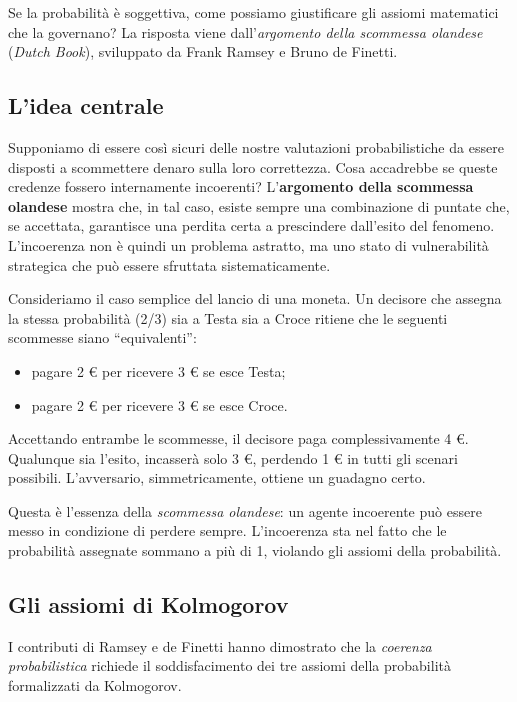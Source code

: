 \documentclass[
  letterpaper,
  DIV=11,
  numbers=noendperiod,
  oneside]{scrreprt}
\providecommand{\tightlist}{%
  \setlength{\itemsep}{0pt}\setlength{\parskip}{0pt}}
\theoremstyle{definition}
\theoremstyle{plain}
\theoremstyle{definition}
\theoremstyle{remark}
\begin{document}
Se la probabilità è soggettiva, come possiamo giustificare gli assiomi
matematici che la governano? La risposta viene dall'\emph{argomento
della scommessa olandese} (\emph{Dutch Book}), sviluppato da Frank
Ramsey e Bruno de Finetti.

\subsection{L'idea centrale}\label{lidea-centrale}

Supponiamo di essere così sicuri delle nostre valutazioni
probabilistiche da essere disposti a scommettere denaro sulla loro
correttezza. Cosa accadrebbe se queste credenze fossero internamente
incoerenti? L'\textbf{argomento della scommessa olandese} mostra che, in
tal caso, esiste sempre una combinazione di puntate che, se accettata,
garantisce una perdita certa a prescindere dall'esito del fenomeno.
L'incoerenza non è quindi un problema astratto, ma uno stato di
vulnerabilità strategica che può essere sfruttata sistematicamente.

Consideriamo il caso semplice del lancio di una moneta. Un decisore che
assegna la stessa probabilità (2/3) sia a Testa sia a Croce ritiene che
le seguenti scommesse siano ``equivalenti'':

\begin{itemize}
\tightlist
\item
  pagare 2 € per ricevere 3 € se esce Testa;
\item
  pagare 2 € per ricevere 3 € se esce Croce.
\end{itemize}

Accettando entrambe le scommesse, il decisore paga complessivamente 4 €.
Qualunque sia l'esito, incasserà solo 3 €, perdendo 1 € in tutti gli
scenari possibili. L'avversario, simmetricamente, ottiene un guadagno
certo.

Questa è l'essenza della \emph{scommessa olandese}: un agente incoerente
può essere messo in condizione di perdere sempre. L'incoerenza sta nel
fatto che le probabilità assegnate sommano a più di 1, violando gli
assiomi della probabilità.

\subsection{Gli assiomi di Kolmogorov}\label{gli-assiomi-di-kolmogorov}

I contributi di Ramsey e de Finetti hanno dimostrato che la
\emph{coerenza probabilistica} richiede il soddisfacimento dei tre
assiomi della probabilità formalizzati da Kolmogorov.
\end{document}
